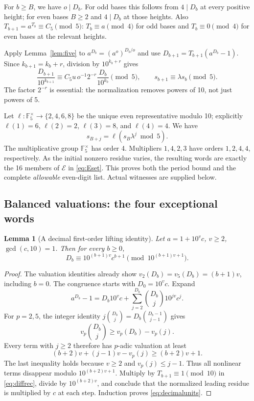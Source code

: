 \documentclass[11pt,letterpaper]{article}
\numberwithin{equation}{section}
\newtheorem{lemma}[theorem]{Lemma}
\theoremstyle{definition}
\newcommand{\F}{\mathbb F}
\newcommand{\Eset}{\mathcal E}
\begin{document}
For $b\geq B$, we have $o\mid D_b$. For odd bases this follows from
$4\mid D_b$ at every positive height; for even bases $B\geq2$ and
$4\mid D_b$ at those heights. Also $T_{b+1}=a^{T_b}\equiv C_5\pmod5$:
$T_b\equiv a\pmod4$ for odd bases and $T_b\equiv0\pmod4$ for even bases
at the relevant heights.

Apply Lemma~\ref{lem:five} to $a^{D_b}=(a^o)^{D_b/o}$ and use
$D_{b+1}=T_{b+1}(a^{D_b}-1)$. Since $k_{b+1}=k_b+r$, division by
$10^{k_b+r}$ gives
\begin{equation}\label{eq:geometric}
 \frac{D_{b+1}}{10^{k_{b+1}}}
 \equiv C_5u\,o^{-1}2^{-r}\frac{D_b}{10^{k_b}}\pmod5,
 \qquad s_{b+1}\equiv\lambda s_b\pmod5.
\end{equation}
The factor $2^{-r}$ is essential: the normalization removes powers of 10,
not just powers of 5.

Let $\ell:\F_5^\times\to\{2,4,6,8\}$ be the unique even representative
modulo 10; explicitly $\ell(1)=6$, $\ell(2)=2$, $\ell(3)=8$, and
$\ell(4)=4$. We have
\begin{equation}\label{eq:lift}
 s_{B+j}=\ell(s_B\lambda^j\bmod5).
\end{equation}
The multiplicative group $\F_5^\times$ has order 4. Multipliers $1,4,2,3$
have orders $1,2,4,4$, respectively. As the initial nonzero residue varies,
the resulting words are exactly the 16 members of $\Eset$ in
\eqref{eq:Eset}. This proves both the period bound and the complete
\emph{allowable} even-digit list. Actual witnesses are supplied below.

\subsection{Balanced valuations: the four exceptional words}

\begin{lemma}[A decimal first-order lifting identity]\label{lem:decimal}
Let $a=1+10^v c$, $v\geq2$, $\gcd(c,10)=1$. Then for every $b\geq0$,
\begin{equation}\label{eq:decimalunits}
 D_b\equiv10^{(b+1)v}c^{b+1}\pmod {10^{(b+1)v+1}}.
\end{equation}
\end{lemma}
\begin{proof}
The valuation identities already show
$v_2(D_b)=v_5(D_b)=(b+1)v$, including $b=0$.
The congruence starts with $D_0=10^v c$. Expand
\begin{equation}\label{eq:binomial}
 a^{D_b}-1=D_b10^v c+
     \sum_{j=2}^{D_b}\binom{D_b}{j}10^{jv}c^j.
\end{equation}
For $p=2,5$, the integer identity
$j\binom{D_b}{j}=D_b\binom{D_b-1}{j-1}$ gives
\[
 v_p\!\binom{D_b}{j}\geq v_p(D_b)-v_p(j).
\]
Every term with $j\geq2$ therefore has $p$-adic valuation at least
\[
 (b+2)v+(j-1)v-v_p(j)\geq(b+2)v+1.
\]
The last inequality holds because $v\geq2$ and $v_p(j)\leq j-1$.
Thus all nonlinear terms disappear modulo $10^{(b+2)v+1}$.
Multiply by $T_{b+1}\equiv1\pmod{10}$ in \eqref{eq:diffrec}, divide by
$10^{(b+2)v}$, and conclude that the normalized leading residue is multiplied
by $c$ at each step. Induction proves \eqref{eq:decimalunits}.
\end{proof}
\end{document}

